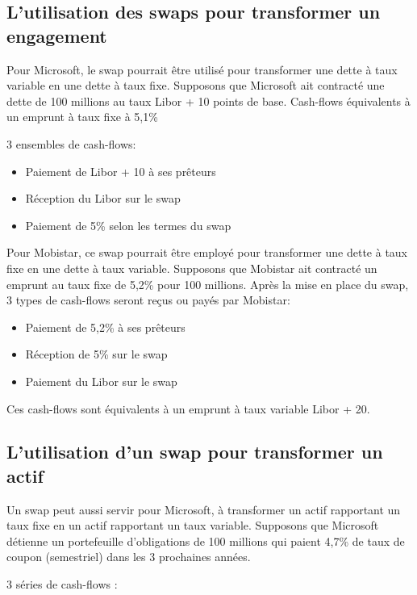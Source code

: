 
	\subsection{L'utilisation des swaps pour transformer un engagement}
	
	Pour Microsoft, le swap pourrait être utilisé pour transformer une dette à 
taux variable en une dette à taux fixe.  Supposons que Microsoft ait contracté une dette de 100 millions au taux Libor + 10 points de base. Cash-flows équivalents à un emprunt à taux fixe à 5,1\% 

	3 ensembles de cash-flows: 
	\begin{itemize}
		\item Paiement de Libor + 10 à ses prêteurs 
		\item Réception du Libor sur le swap 
		\item Paiement de 5\% selon les termes du swap
	\end{itemize}

	Pour Mobistar, ce swap pourrait être employé pour transformer une dette à taux fixe en une dette à taux variable. Supposons que Mobistar ait contracté un emprunt au taux fixe de 5,2\% pour 100 millions.  Après la mise en place du swap, 3 types de cash-flows seront reçus ou payés par Mobistar: 
	\begin{itemize}
		\item Paiement de 5,2\% à ses prêteurs 
		\item Réception de 5\% sur le swap 
		\item Paiement du Libor sur le swap 
	\end{itemize}

	Ces cash-flows sont équivalents à un emprunt à taux variable Libor + 20.
	

	\subsection{L'utilisation d'un swap pour transformer un actif}

	
	Un swap peut aussi servir pour Microsoft, à transformer un actif rapportant un taux fixe en un actif rapportant un taux variable. Supposons que Microsoft détienne un portefeuille d'obligations de 100 millions qui paient 4,7\% de taux de coupon (semestriel) dans les 3 prochaines années.
	
	3 séries de cash-flows :
	
